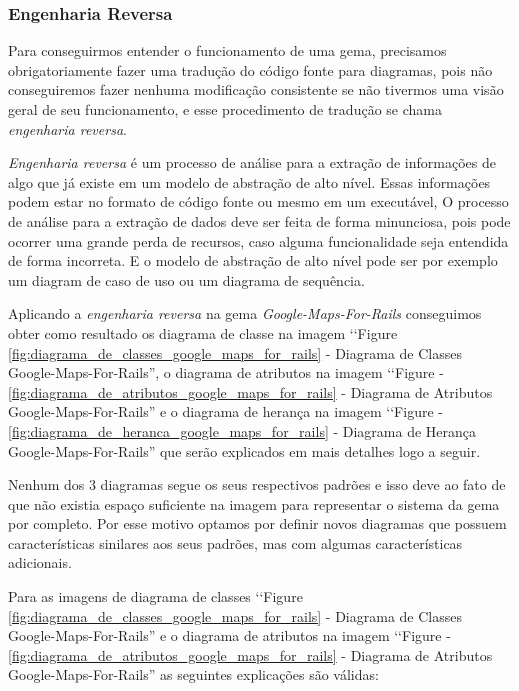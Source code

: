 \subsubsection{Engenharia Reversa}
\label{engenharia_reversa}

Para conseguirmos entender o funcionamento de uma gema, precisamos obrigatoriamente fazer uma tradução
do código fonte para diagramas, pois não conseguiremos fazer nenhuma modificação consistente
se não tivermos uma visão geral de seu funcionamento, e esse procedimento de tradução se chama 
\emph{engenharia reversa}.

\emph{Engenharia reversa} é um processo de análise para a extração de informações de algo que já 
existe em um modelo de abstração de alto nível. Essas informações podem estar no formato de código 
fonte ou mesmo em um executável, O processo de análise para a extração de dados deve ser feita de forma
minunciosa, pois pode ocorrer uma grande perda de recursos, caso alguma funcionalidade seja entendida de
forma incorreta. E o modelo de abstração de alto nível pode ser por exemplo um diagram de caso de uso ou
um diagrama de sequência.

Aplicando a \emph{engenharia reversa} na gema \emph{Google-Maps-For-Rails} conseguimos obter como resultado
os diagrama de classe na imagem ‘‘Figure \ref{fig:diagrama_de_classes_google_maps_for_rails} - Diagrama de 
Classes Google-Maps-For-Rails'', o diagrama de atributos na imagem ‘‘Figure - 
\ref{fig:diagrama_de_atributos_google_maps_for_rails} - Diagrama de Atributos Google-Maps-For-Rails'' e o 
diagrama de herança na imagem ‘‘Figure - \ref{fig:diagrama_de_heranca_google_maps_for_rails} - Diagrama de 
Herança Google-Maps-For-Rails'' que serão explicados em mais detalhes logo a seguir.

Nenhum dos 3 diagramas segue os seus respectivos padrões e isso deve ao fato de que não existia espaço 
suficiente na imagem para representar o sistema da gema por completo. Por esse motivo optamos por definir 
novos diagramas que possuem características sinilares aos seus padrões, mas com algumas características
adicionais.

Para as imagens de diagrama de classes ‘‘Figure \ref{fig:diagrama_de_classes_google_maps_for_rails} - 
Diagrama de Classes Google-Maps-For-Rails'' e o diagrama de atributos na imagem ‘‘Figure - 
\ref{fig:diagrama_de_atributos_google_maps_for_rails} - Diagrama de Atributos Google-Maps-For-Rails''
as seguintes explicações são válidas:

